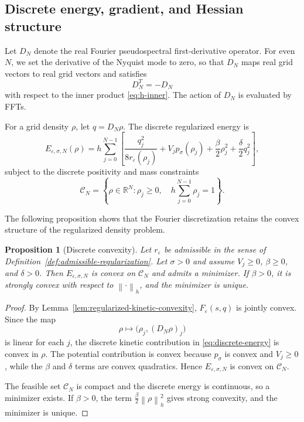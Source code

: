 \documentclass[11pt]{article}
\newcommand{\R}{\mathbb{R}}
\newcommand{\CN}{\mathcal{C}_N}
\newcommand{\eps}{\varepsilon}
\newcommand{\sig}{\sigma}
\newcommand{\norm}[1]{\left\|#1\right\|}
\theoremstyle{plain}
\newtheorem{proposition}[theorem]{Proposition}
\theoremstyle{definition}
\numberwithin{equation}{section}
\begin{document}
\subsection{Discrete energy, gradient, and Hessian structure}

Let $D_N$ denote the real Fourier pseudospectral first-derivative
operator. For even $N$, we set the derivative of the Nyquist mode to
zero, so that $D_N$ maps real grid vectors to real grid vectors and
satisfies
\begin{equation}
\label{eq:skew-adjoint}
D_N^T=-D_N
\end{equation}
with respect to the inner product \eqref{eq:h-inner}. The action of
$D_N$ is evaluated by FFTs.

For a grid density $\rho$, let $q=D_N\rho$. The discrete regularized
energy is
\begin{equation}
\label{eq:discrete-energy}
E_{\eps,\sig,N}(\rho)
=
h\sum_{j=0}^{N-1}
\left[
\frac{q_j^2}{8r_\eps(\rho_j)}
+V_jp_\sig(\rho_j)
+\frac{\beta}{2}\rho_j^2
+\frac{\delta}{2}q_j^2
\right],
\end{equation}
subject to the discrete positivity and mass constraints
\begin{equation}
\label{eq:discrete-feasible}
\CN
=
\left\{
\rho\in\R^N:
\rho_j\ge0,
\quad
h\sum_{j=0}^{N-1}\rho_j=1
\right\}.
\end{equation}

The following proposition shows that the Fourier discretization
retains the convex structure of the regularized density problem.

\begin{proposition}[Discrete convexity]
\label{prop:discrete-convex}
Let $r_\eps$ be admissible in the sense of
Definition~\ref{def:admissible-regularization}. Let $\sig>0$ and assume
$V_j\ge0$, $\beta\ge0$, and $\delta>0$.
Then $E_{\eps,\sig,N}$ is convex on $\CN$ and admits a minimizer.
If $\beta>0$, it is strongly convex with respect to
$\norm{\cdot}_h$, and the minimizer is unique.
\end{proposition}


\begin{proof}
By Lemma~\ref{lem:regularized-kinetic-convexity},
$F_\eps(s,q)$ is jointly convex. Since the map
\[
\rho
\mapsto
\bigl(\rho_j,(D_N\rho)_j\bigr)
\]
is linear for each $j$, the discrete kinetic contribution in
\eqref{eq:discrete-energy} is convex in $\rho$.
The potential contribution is convex because $p_\sig$ is convex and
$V_j\ge0$, while the $\beta$ and $\delta$ terms are convex
quadratics. Hence $E_{\eps,\sig,N}$ is convex on $\CN$.

The feasible set $\CN$ is compact and the discrete energy is
continuous, so a minimizer exists. If $\beta>0$, the term
$\frac{\beta}{2}\norm{\rho}_h^2$ gives strong convexity, and the
minimizer is unique.
\end{proof}
\end{document}
